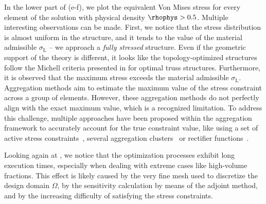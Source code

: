 In the lower part of  (e-f), we plot the equivalent Von Mises stress for every element of the solution with physical density $\rhophys>0.5$. Multiple interesting observations can be made. First, we notice that the stress distribution is almost uniform in the structure, and it tends to the value of the material admissible $\sigma_\text{L}$ -- \ie we approach a \textit{fully stressed} structure. Even if the geometric support of the theory is different, it looks like the topology-optimized structures follow the Michell criteria presented in  for optimal truss structures. Furthermore, it is observed that the maximum stress exceeds the material admissible $\sigma_\text{L}$. Aggregation methods aim to estimate the maximum value of the stress constraint across a group of elements. However, these aggregation methods do not perfectly align with the exact maximum value, which is a recognized limitation. To address this challenge, multiple approaches have been proposed within the aggregation framework to accurately account for the true constraint value, like using a set of active stress constraints~, several aggregation clusters~ or rectifier functions~.

Looking again at , we notice that the optimization processes exhibit long execution times, especially when dealing with extreme cases like high-volume fractions. This effect is likely caused by the very fine mesh used to discretize the design domain $\Omega$, by the sensitivity calculation by means of the adjoint method, and by the increasing difficulty of satisfying the stress constraints.

